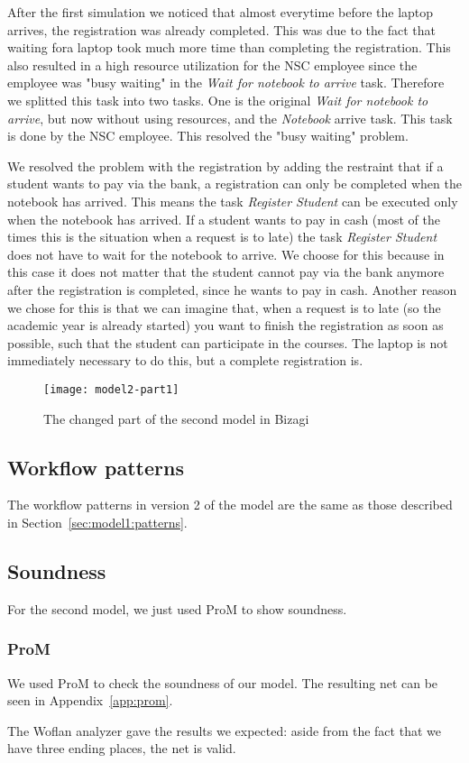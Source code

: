 After the first simulation we noticed that almost everytime before the laptop arrives, the registration was already completed.
This was due to the fact that waiting fora laptop took much more time than completing the registration.
This also resulted in a  high resource utilization for the NSC employee since the employee was "busy waiting" in the \emph{Wait for notebook to arrive} task.
Therefore we splitted this task into two tasks. One is the original \emph{Wait for notebook to arrive}, but now without using resources, and the \emph{Notebook} arrive task.
This task is done by the NSC employee. This resolved the "busy waiting" problem.

We resolved the problem with the registration by adding the restraint that if a student wants to pay via the bank, a registration can only be completed when the notebook has arrived.
This means the task \emph{Register Student} can be executed only when the notebook has arrived.
If a student wants to pay in cash (most of the times this is the situation when a request is to late) the task \emph{Register Student} does not have to wait for the notebook to arrive.
We choose for this because in this case it does not matter that the student cannot pay via the bank anymore after the registration is completed, since he wants to pay in cash.
Another reason we chose for this is that we can imagine that,
when a request is to late (so the academic year is already started) you want to finish the registration as soon as possible, such that the student can participate in the courses.
The laptop is not immediately necessary to do this, but a complete registration is.

\begin{figure}[H]
	\centering
	\texttt{[image: model2-part1]}
	\caption{The changed part of the second model in Bizagi}
	\label{fig:model2-part1}
\end{figure}

\subsection{Workflow patterns}

The workflow patterns in version 2 of the model are the same as those described in Section~\ref{sec:model1:patterns}.

\subsection{Soundness}

For the second model, we just used ProM to show soundness.

\subsubsection{ProM}

We used ProM to check the soundness of our model.
The resulting net can be seen in Appendix~\ref{app:prom}.

The Woflan analyzer gave the results we expected: aside from the fact that we have three ending places, the net is valid.
